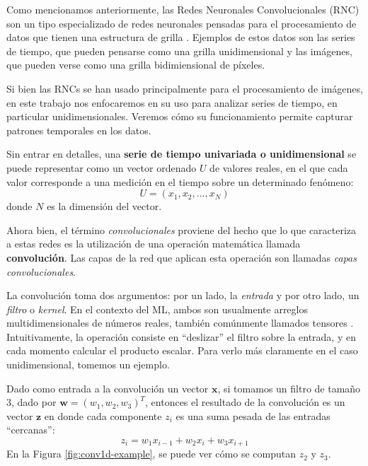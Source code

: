\documentclass[../../main.tex]{subfiles}
\begin{document}
Como mencionamos anteriormente, las Redes Neuronales Convolucionales (RNC) son un tipo
especializado de redes neuronales pensadas para el procesamiento de datos que tienen una
estructura de grilla \cite{deep-learning}. Ejemplos de estos datos son las series de
tiempo, que pueden pensarse como una grilla unidimensional y las imágenes, que pueden
verse como una grilla bidimiensional de píxeles.

Si bien las RNCs se han usado principalmente para el procesamiento de imágenes, en este
trabajo nos enfocaremos en su uso para analizar series de tiempo, en particular
unidimensionales. Veremos cómo su funcionamiento permite capturar patrones temporales en
los datos.

Sin entrar en detalles\footnotemark, una \textbf{serie de tiempo univariada o
unidimensional} se puede representar como un vector ordenado \(U\) de valores reales, en
el que cada valor corresponde a una medición en el tiempo sobre un determinado fenómeno:
\[
    U = (x_1, x_2, ..., x_N)
\]
donde \(N\) es la dimensión del vector.

Ahora bien, el término \textit{convolucionales} proviene del hecho que lo que caracteriza
a estas redes es la utilización de una operación matemática llamada
\textbf{convolución}\footnotemark \cite{deep-learning}. Las capas de la red que aplican
esta operación son llamadas \textit{capas convolucionales}. 

La convolución toma dos argumentos: por un lado, la \textit{entrada} y por otro lado, un
\textit{filtro} o \textit{kernel}. En el contexto del ML, ambos son usualmente arreglos
multidimensionales de números reales, también comúnmente llamados tensores
\cite{deep-learning}. Intuitivamente, la operación consiste en ``deslizar'' el filtro
sobre la entrada, y en cada momento calcular el producto escalar. Para verlo más
claramente en el caso unidimensional, tomemos un ejemplo.

Dado como entrada a la convolución un vector \(\mathbf{x}\), si tomamos un filtro de
tamaño 3, dado por \(\bm{w}=(w_1, w_2, w_3)^T\), entonces el resultado de la convolución
es un vector \(\mathbf{z}\) en donde cada componente \(z_i\) es una suma pesada de las
entradas ``cercanas'':
\[z_i = w_1 x_{i-1} + w_2 x_{i} + w_3 x_{i+1}\]
En la Figura \ref{fig:conv1d-example}, se puede ver cómo se computan \(z_2\) y \(z_3\).
\end{document}

